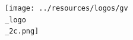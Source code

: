 \documentclass[
      american,
      12pt,
      letterpaper,
    ]{article}
\begin{document}
\begin{titlepage}
\newcommand{\titlepageheaderblock}{\headerstyled}

\newcommand{\titlepagefooterblock}{
\footerstyled
}

\newcommand{\titlepagedateblock}{
\datestyled
}

	\newcommand{\titleblock}{				\newlength{\betweentitlesubtitle}
		\setlength{\betweentitlesubtitle}{\baselineskip}
				{
				\titlepagetitlefont
				{\titlepagetitleblock}
			}

		\vspace{1.5cm}
		}

	\newcommand{\authorblock}{		{\titlepageauthorfont
				\titlepageauthorblock}

		\vspace{1.5cm}
		}

	\newcommand{\affiliationblock}{		{\titlepageaffiliationfont
				\titlepageaffiliationblock}

		\vspace{0pt}
		}

	\newcommand{\logoblock}{		{\texttt{[image: ../resources/logos/gv\\\_logo\\\_2c.png]}}

		\vspace{2\baselineskip}
		}

	\newcommand{\footerblock}{}

	\newcommand{\dateblock}{		{\titlepagedateblock}

		\vspace{0pt}
		}

	\newcommand{\headerblock}{}

		\thispagestyle{empty} %
	

		\newlength{\minipagewidth}
		\setlength{\minipagewidth}{\textwidth}
			\raggedright %
		\begin{minipage}[b][\textheight][s]{\minipagewidth}
			\titlepagepagealign
						\headerblock
			
						\logoblock
			
						\titleblock
			
						\authorblock
						\par

		\end{minipage}
		\clearpage
\end{titlepage}
\setcounter{page}{1}
\end{document}
